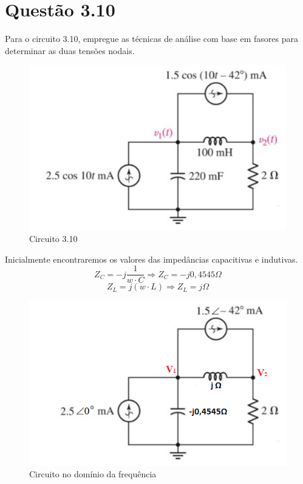 \documentclass[
	12pt,				%
	oneside,			%
	a4paper,			%
	english,			%
	french,				%
	spanish,			%
	brazil				%
	]{abntex2}
\begin{document}
\section*{Questão 3.10}
Para o circuito 3.10, empregue as técnicas de análise com base em fasores para determinar as duas tensões nodais.
\newline
\begin{figure}[htb]
	\centering
	\includegraphics[scale=2]{circuito310.png}
	\caption{Circuito 3.10}
\end{figure}
\newline
Inicialmente encontraremos os valores das impedâncias capacitivas e indutivas. 
$$Z_C = -j\dfrac{1}{w \cdot C} \Longrightarrow Z_C = -j0,4545 \Omega$$
$$Z_L = j(w \cdot L) \Longrightarrow Z_L = j \Omega$$
\begin{figure}[htb]
	\centering
	\includegraphics[scale=2]{circuito310-2.png}
	\caption{Circuito no domínio da frequência}
\end{figure}
\end{document}
